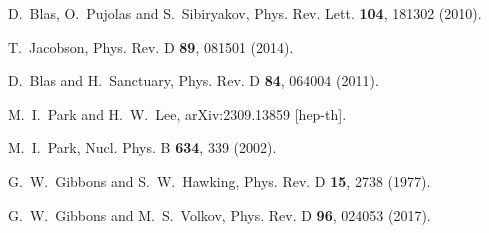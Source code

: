 \documentclass[preprint,aps,tightenlines,showkeys,nofootinbib,superscriptaddress]{revtex4}
\begin{document}
\begin{thebibliography}{999}

D.~Blas, O.~Pujolas and S.~Sibiryakov,
Phys. Rev. Lett. \textbf{104}, 181302 (2010).

T.~Jacobson,
Phys. Rev. D \textbf{89}, 081501 (2014).

D.~Blas and H.~Sanctuary,
Phys. Rev. D \textbf{84}, 064004 (2011).


M.~I.~Park and H.~W.~Lee,
arXiv:2309.13859 [hep-th].


M.~I.~Park,
Nucl. Phys. B \textbf{634}, 339
(2002).

G.~W.~Gibbons and S.~W.~Hawking,
Phys. Rev. D \textbf{15}, 2738
(1977).

G.~W.~Gibbons and M.~S.~Volkov,
Phys. Rev. D \textbf{96},
024053 (2017).


\end{thebibliography}
\end{document}
